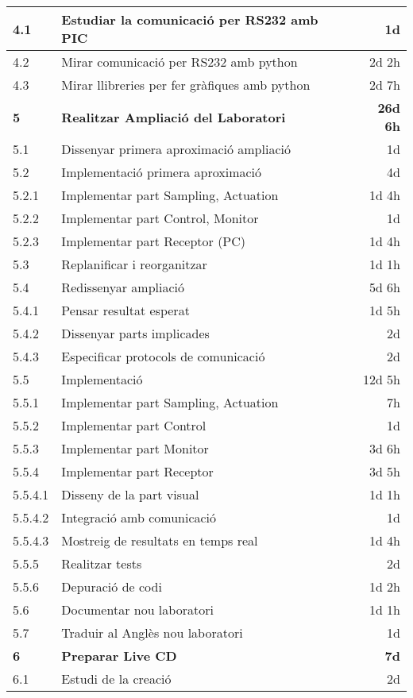 \begin{center}
\begin{longtable}{ l | p{10cm} | r }
\hline
4.1 &  Estudiar la comunicació per RS232 amb PIC & 1d\\
\hline
4.2 &  Mirar comunicació per RS232 amb python & 2d 2h\\
\hline
4.3 &  Mirar llibreries per fer gràfiques amb python & 2d 7h\\
\hline \hline
	\textbf{5} & 	\textbf{ Realitzar Ampliació del Laboratori } & 	\textbf{26d 6h}\\
\hline
5.1 & Dissenyar primera aproximació ampliació & 1d\\
\hline
5.2 & Implementació primera aproximació & 4d\\
\hline
5.2.1 & Implementar part Sampling, Actuation & 1d 4h\\
\hline
5.2.2 & Implementar part Control, Monitor & 1d\\
\hline
5.2.3 & Implementar part Receptor (PC) & 1d 4h\\
\hline
5.3 & Replanificar i reorganitzar & 1d 1h\\
\hline
5.4 & Redissenyar ampliació & 5d 6h\\
\hline
5.4.1 & Pensar resultat esperat & 1d 5h\\
\hline
5.4.2 & Dissenyar parts implicades & 2d\\
\hline
5.4.3 & Especificar protocols de comunicació & 2d\\
\hline
5.5 & Implementació & 12d 5h\\
\hline
5.5.1 & Implementar part Sampling, Actuation & 7h\\
\hline
5.5.2 & Implementar part Control & 1d\\
\hline
5.5.3 & Implementar part Monitor & 3d 6h\\
\hline
5.5.4 & Implementar part Receptor & 3d 5h\\
\hline
5.5.4.1 & Disseny de la part visual & 1d 1h\\
\hline
5.5.4.2 & Integració amb comunicació & 1d\\
\hline
5.5.4.3 & Mostreig de resultats en temps real & 1d 4h\\
\hline
5.5.5 & Realitzar tests & 2d\\
\hline
5.5.6 & Depuració de codi & 1d 2h\\
\hline
5.6 & Documentar nou laboratori & 1d 1h\\
\hline
5.7 & Traduir al Anglès nou laboratori & 1d\\
\hline \hline
	\textbf{6} & 	\textbf{Preparar Live CD } & 	\textbf{7d}\\
\hline
6.1 & Estudi de la creació & 2d\\

\end{longtable}
\end{center}
